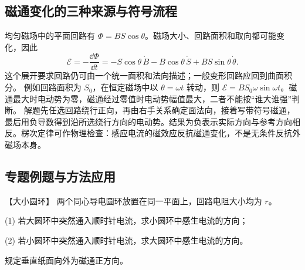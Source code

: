 {%
\subsection{磁通变化的三种来源与符号流程}
均匀磁场中的平面回路有 $\Phi=BS\cos\theta$。磁场大小、回路面积和取向都可能变化，因此
\[
 \mathcal E=-\frac{\dd\Phi}{\dd t}
 =-S\cos\theta\,\dot B-B\cos\theta\,\dot S
 +BS\sin\theta\,\dot\theta.
\]
这个展开要求回路仍可由一个统一面积和法向描述；一般变形回路应回到曲面积分。
例如回路面积为 $S_0$，在恒定磁场中以 $\theta=\omega t$ 转动，则 $\mathcal E=BS_0\omega\sin\omega t$。磁通最大时电动势为零，磁通经过零值时电动势幅值最大，二者不能按“谁大谁强”判断。
解题先任选回路绕行正向，再由右手关系确定面法向，接着写带符号磁通，最后用负导数得到沿所选绕行方向的电动势。结果为负表示实际方向与参考方向相反。楞次定律可作物理检查：感应电流的磁效应反抗磁通变化，不是无条件反抗外磁场本身。


\subsection{专题例题与方法应用}

\begin{origexamplebox}{【大小圆环】}\label{ch24:ex:s40-9-1}
两个同心导电圆环放置在同一平面上，回路电阻大小均为 $r$。

(1) 若大圆环中突然通入顺时针电流，求小圆环中感生电流的方向；

(2) 若小圆环中突然通入顺时针电流，求大圆环中感生电流的方向。

\begin{center}\end{center}
\end{origexamplebox}

\begin{xesolution}
规定垂直纸面向外为磁通正方向。


\end{xesolution}}
